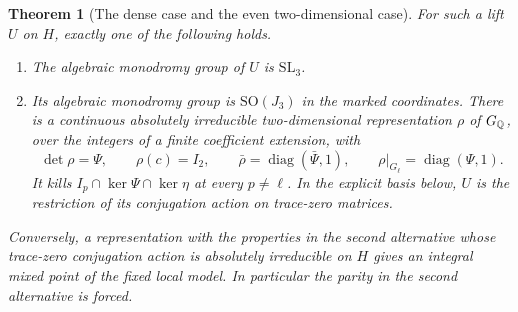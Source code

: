 \documentclass[a4paper,11pt]{article}
\newtheorem{theorem}[proposition]{Theorem}
\theoremstyle{definition}
\theoremstyle{remark}
\numberwithin{equation}{section}
\begin{document}
\begin{theorem}[The dense case and the even two-dimensional case]\label{thm:mon44}
For such a lift \(U\) on \(H\), exactly one of the following holds.
\begin{enumerate}\setlength{\itemsep}{1pt}
\item The algebraic monodromy group of \(U\) is \(\mathrm{SL}_3\).
\item Its algebraic monodromy group is \(\mathrm{SO}(J_3)\) in the marked coordinates. There is a continuous absolutely irreducible two-dimensional representation \(\rho\) of \(G_\mathbb Q\), over the integers of a finite coefficient extension, with
\[
 \det\rho=\Psi,\qquad \rho(c)=I_2,\qquad
 \bar\rho=\operatorname{diag}(\bar\Psi,1),\qquad
 \rho|_{G_\ell}=\operatorname{diag}(\Psi,1).
\]
It kills \(I_p\cap\ker\Psi\cap\ker\eta\) at every \(p\ne\ell\). In the explicit basis below, \(U\) is the restriction of its conjugation action on trace-zero matrices.
\end{enumerate}
Conversely, a representation with the properties in the second alternative whose trace-zero conjugation action is absolutely irreducible on \(H\) gives an integral mixed point of the fixed local model. In particular the parity in the second alternative is forced.
\end{theorem}
\end{document}
